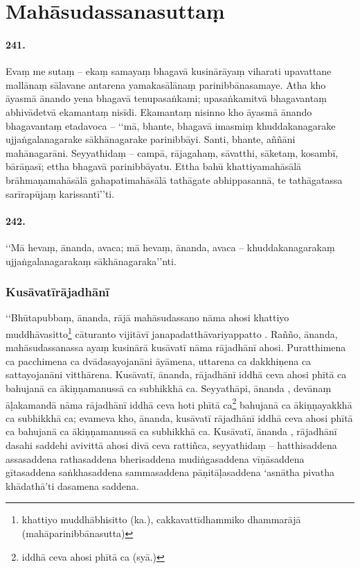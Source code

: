 \section{Mahāsudassanasuttaṃ}

\paragraph{241.} Evaṃ me sutaṃ – ekaṃ samayaṃ bhagavā kusinārāyaṃ viharati upavattane mallānaṃ sālavane antarena yamakasālānaṃ parinibbānasamaye. Atha kho āyasmā ānando yena bhagavā tenupasaṅkami; upasaṅkamitvā bhagavantaṃ abhivādetvā ekamantaṃ nisīdi. Ekamantaṃ nisinno kho āyasmā ānando bhagavantaṃ etadavoca – ‘‘mā, bhante, bhagavā imasmiṃ khuddakanagarake ujjaṅgalanagarake sākhānagarake parinibbāyi. Santi, bhante, aññāni mahānagarāni. Seyyathidaṃ – campā, rājagahaṃ, sāvatthi, sāketaṃ, kosambī, bārāṇasī; ettha bhagavā parinibbāyatu. Ettha bahū khattiyamahāsālā brāhmaṇamahāsālā gahapatimahāsālā tathāgate abhippasannā, te tathāgatassa sarīrapūjaṃ karissantī’’ti.

\paragraph{242.} ‘‘Mā hevaṃ, ānanda, avaca; mā hevaṃ, ānanda, avaca – khuddakanagarakaṃ ujjaṅgalanagarakaṃ sākhānagaraka’’nti.

\subsubsection{Kusāvatīrājadhānī}

‘‘Bhūtapubbaṃ, ānanda, rājā mahāsudassano nāma ahosi khattiyo muddhāvasitto\footnote{khattiyo muddhābhisitto (ka.), cakkavattīdhammiko dhammarājā (mahāparinibbānasutta)} cāturanto vijitāvī janapadatthāvariyappatto . Rañño, ānanda, mahāsudassanassa ayaṃ kusinārā kusāvatī nāma rājadhānī ahosi. Puratthimena ca pacchimena ca dvādasayojanāni āyāmena, uttarena ca dakkhiṇena ca sattayojanāni vitthārena. Kusāvatī, ānanda, rājadhānī iddhā ceva ahosi phītā ca bahujanā ca ākiṇṇamanussā ca subhikkhā ca. Seyyathāpi, ānanda , devānaṃ āḷakamandā nāma rājadhānī iddhā ceva hoti phītā ca\footnote{iddhā ceva ahosi phītā ca (syā.)} bahujanā ca ākiṇṇayakkhā ca subhikkhā ca; evameva kho, ānanda, kusāvatī rājadhānī iddhā ceva ahosi phītā ca bahujanā ca ākiṇṇamanussā ca subhikkhā ca. Kusāvatī, ānanda , rājadhānī dasahi saddehi avivittā ahosi divā ceva rattiñca, seyyathidaṃ – hatthisaddena assasaddena rathasaddena bherisaddena mudiṅgasaddena vīṇāsaddena gītasaddena saṅkhasaddena sammasaddena pāṇitāḷasaddena ‘asnātha pivatha khādathā’ti dasamena saddena.

